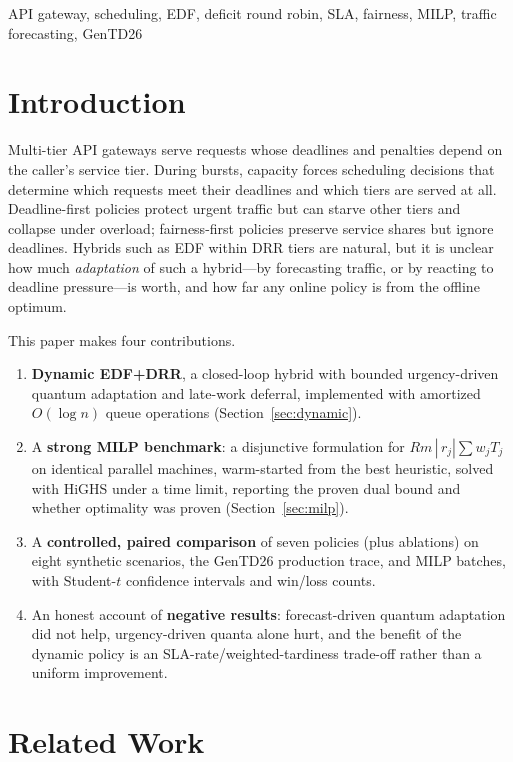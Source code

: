 \documentclass[conference]{IEEEtran}
\begin{document}
\begin{IEEEkeywords}
API gateway, scheduling, EDF, deficit round robin, SLA, fairness, MILP, traffic forecasting, GenTD26
\end{IEEEkeywords}

\section{Introduction}

Multi-tier API gateways serve requests whose deadlines and penalties depend on the caller's service tier. During bursts, capacity forces scheduling decisions that determine which requests meet their deadlines and which tiers are served at all. Deadline-first policies protect urgent traffic but can starve other tiers and collapse under overload; fairness-first policies preserve service shares but ignore deadlines. Hybrids such as EDF within DRR tiers are natural, but it is unclear how much \emph{adaptation} of such a hybrid---by forecasting traffic, or by reacting to deadline pressure---is worth, and how far any online policy is from the offline optimum.

This paper makes four contributions.
\begin{enumerate}
\item \textbf{Dynamic EDF+DRR}, a closed-loop hybrid with bounded urgency-driven quantum adaptation and late-work deferral, implemented with amortized $O(\log n)$ queue operations (Section~\ref{sec:dynamic}).
\item A \textbf{strong MILP benchmark}: a disjunctive formulation for $Rm\,|\,r_j|\sum w_jT_j$ on identical parallel machines, warm-started from the best heuristic, solved with HiGHS under a time limit, reporting the proven dual bound and whether optimality was proven (Section~\ref{sec:milp}).
\item A \textbf{controlled, paired comparison} of seven policies (plus ablations) on eight synthetic scenarios, the GenTD26 production trace, and MILP batches, with Student-$t$ confidence intervals and win/loss counts.
\item An honest account of \textbf{negative results}: forecast-driven quantum adaptation did not help, urgency-driven quanta alone hurt, and the benefit of the dynamic policy is an SLA-rate/weighted-tardiness trade-off rather than a uniform improvement.
\end{enumerate}

\section{Related Work}
\end{document}
